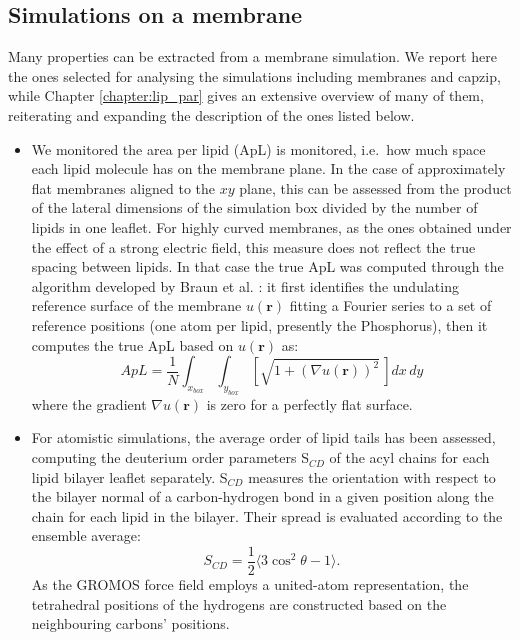 \subsection{Simulations on a membrane}

Many properties can be extracted from a membrane simulation. We report here the ones selected for analysing the simulations including membranes and capzip, while Chapter \ref{chapter:lip_par} gives an extensive overview of many of them, reiterating and expanding the description of the ones listed below.

\begin{itemize}
\item We monitored the area per lipid (ApL) is monitored, i.e.\ how much space each lipid molecule has on the membrane plane. In the case of approximately flat membranes aligned to the $xy$ plane, this can be assessed from the product of the lateral dimensions of the simulation box divided by the number of lipids in one leaflet.
%
For highly curved membranes, as the ones obtained under the effect of a strong electric field, this measure does not reflect the true spacing between lipids. In that case the true ApL was computed through the algorithm developed by Braun et al. \citep{Braun2011}: it first identifies the undulating reference surface of the membrane $u(\textbf{r})$ fitting a Fourier series to a set of reference positions (one atom per lipid, presently the Phosphorus), then it computes the true ApL based on $u(\textbf{r})$ as:
\begin{equation}
ApL = \frac{1}{N} \int_{x_{box}} \int_{y_{box}} \left[ \sqrt{1 + \left( \nabla u(\textbf{r}) \right)^2} \, \right] dx\,dy
\end{equation}
where the gradient $\nabla u(\textbf{r})$ is zero for a perfectly flat surface.

\item For atomistic simulations, the average order of lipid tails has been assessed, computing the deuterium order parameters S$_{CD}$ of the acyl chains for each lipid bilayer leaflet separately. S$_{CD}$ measures the orientation with respect to the bilayer normal of a carbon-hydrogen bond in a given position along the chain for each lipid in the bilayer. Their spread is evaluated according to the ensemble average:
\begin{equation}
S_{CD} = \frac{1}{2} \langle 3\cos^2 \theta - 1 \rangle.
\end{equation}
As the GROMOS force field employs a united-atom representation, the tetrahedral positions of the hydrogens are constructed based on the neighbouring carbons’ positions.


\end{itemize}
